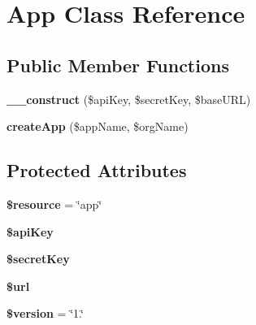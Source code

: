 \hypertarget{class_app}{\section{App Class Reference}
\label{class_app}
}
\subsection*{Public Member Functions}
\begin{DoxyCompactItemize}
\item 
\hypertarget{class_app_a64796446562651ec72385eb4efea9c6c}{{\bfseries \+\_\+\+\_\+construct} (\$api\+Key, \$secret\+Key, \$base\+U\+R\+L)}\label{class_app_a64796446562651ec72385eb4efea9c6c}

\item 
\hypertarget{class_app_af9ac66f6996e2a27072932de344c46f5}{{\bfseries create\+App} (\$app\+Name, \$org\+Name)}\label{class_app_af9ac66f6996e2a27072932de344c46f5}

\end{DoxyCompactItemize}
\subsection*{Protected Attributes}
\begin{DoxyCompactItemize}
\item 
\hypertarget{class_app_abd4c7b8b084214b8d2533ba07fce6b83}{{\bfseries \$resource} = \char`\"{}app\char`\"{}}\label{class_app_abd4c7b8b084214b8d2533ba07fce6b83}

\item 
\hypertarget{class_app_a084e3db37d1b117a3cc7212cf2eed533}{{\bfseries \$api\+Key}}\label{class_app_a084e3db37d1b117a3cc7212cf2eed533}

\item 
\hypertarget{class_app_a766bfb236de2f29a3680976ca22790d4}{{\bfseries \$secret\+Key}}\label{class_app_a766bfb236de2f29a3680976ca22790d4}

\item 
\hypertarget{class_app_acf215f34a917d014776ce684a9ee8909}{{\bfseries \$url}}\label{class_app_acf215f34a917d014776ce684a9ee8909}

\item 
\hypertarget{class_app_a17c8948c68aa44fa9961ae169b6a8961}{{\bfseries \$version} = \char`\"{}1.\char`\"{}}\label{class_app_a17c8948c68aa44fa9961ae169b6a8961}

\end{DoxyCompactItemize}
